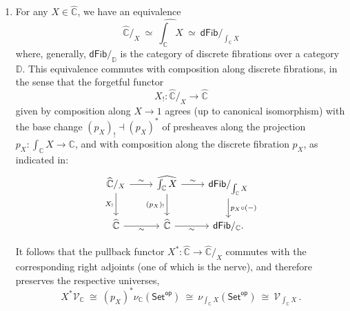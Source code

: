 \documentclass[11pt]{amsart}
\newcommand{\bbC}{\ensuremath{\mathbb{C}}}
\newcommand{\Set}{\ensuremath{\mathsf{Set}}}
\renewcommand{\to}{\ensuremath{\rightarrow}}
\newcommand{\V}{\ensuremath{\mathcal{V}}}
\theoremstyle{remark}
\theoremstyle{definition}
\begin{document}
\begin{enumerate}
\item For any $X\in \widehat{\bbC}$, we have an equivalence 
\[
\widehat{\bbC}/_X\ %
\simeq\ \widehat{\textstyle \int_{\bbC}X}\ \simeq\ \mathsf{dFib}/_{\int_{\bbC}X}
\]
where, generally, $\mathsf{dFib}/_{\mathbb{D}}$ is the category of discrete fibrations over a category $\mathbb{D}$.
This equivalence commutes with composition along discrete fibrations, in the sense that the forgetful functor $${X_!}: \widehat{\bbC}/_X \to \widehat{\bbC}$$ given by composition along $X \to 1$ agrees (up to canonical isomorphism) with the base change $(p_X)_! \dashv (p_X)^*$ of presheaves along the projection  ${\textstyle  p_X : \int_{\bbC}X \to  \bbC}$, and with composition along the discrete fibration $p_X$, as indicated in:
\begin{equation}\label{diagram:sliceuniversepullsback}
\begin{tikzcd}
\widehat{\bbC}/_X  \ar[d,swap,"{{X_!}}"] \ar[r, "{\sim}"] 
	& \widehat{\textstyle \int_{\bbC}X} \ar[d,swap,"{{(p_X)_!}}"] \ar[r, "{\sim}"] 
		& \mathsf{dFib}/_{\int_{\bbC}X} \ar[d,"p_X\circ(-)"]  \\
 \widehat{\bbC}  \ar[r,swap, "{\sim}"]   & \widehat{\bbC}  \ar[r,swap, "{\sim}"] 
	&  \mathsf{dFib}/_{\bbC}.
\end{tikzcd}
\end{equation}

It follows that the pullback functor $X^* : \widehat{\bbC} \to \widehat{\bbC}/_X$ commutes with the corresponding right adjoints (one of which is the nerve), and therefore preserves the respective universes, 
\[\textstyle
 X^* \V_{\bbC} \ 
   \cong\ (p_X)^* \nu_{\bbC}(\Set^{\mathsf{op}}) \ 
   \cong\  \nu_{\int_{\bbC}X}(\Set^{\mathsf{op}}) \ 
   \cong\  \V_{ \int_{\bbC}X} \,.
 \]


\end{enumerate}
\end{document}
